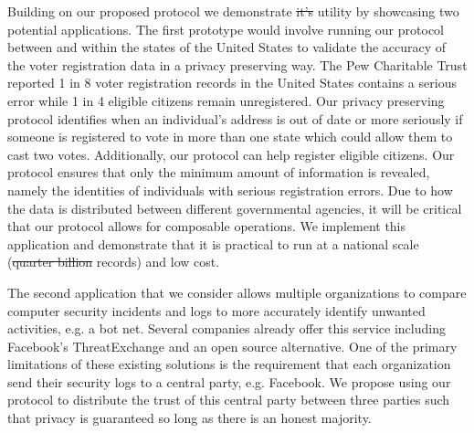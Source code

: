 \documentclass[11pt,letterpaper]{article}
\providecommand{\DIFaddtex}[1]{{\protect\color{blue}\uwave{#1}}} %
\providecommand{\DIFdeltex}[1]{{\protect\color{red}\sout{#1}}}                      %
\providecommand{\DIFaddbegin}{} %
\providecommand{\DIFaddend}{} %
\providecommand{\DIFdelbegin}{} %
\providecommand{\DIFdelend}{} %
\providecommand{\DIFadd}[1]{\texorpdfstring{\DIFaddtex{#1}}{#1}} %
\providecommand{\DIFdel}[1]{\texorpdfstring{\DIFdeltex{#1}}{}} %
\begin{document}
Building on our proposed protocol we demonstrate \DIFdelbegin \DIFdel{it's }\DIFdelend \DIFaddbegin \DIFadd{its }\DIFaddend utility by showcasing two potential applications. The first prototype would involve running our protocol between and within the states of the United States to validate the accuracy of the voter registration data in a privacy preserving way. The Pew Charitable Trust\cite{pew} reported 1 in 8 voter registration records in the United States contains a serious error while 1 in 4 eligible citizens remain unregistered. Our privacy preserving protocol identifies when an individual's address is out of date or more seriously if someone is registered to vote in more than one state which could allow them to cast two votes. 
\iffullversion
Additionally, our protocol can help register eligible citizens. Our protocol ensures that only the minimum amount of information is revealed, namely the identities of individuals with serious registration errors.
\fi 
Due to how the data is distributed between different governmental agencies, it will be critical that our protocol allows for composable operations. We implement this application and demonstrate that it is practical to run at a national scale (\DIFdelbegin \DIFdel{quarter billion }\DIFdelend \DIFaddbegin \DIFadd{250M }\DIFaddend records) and low cost.

The second application that we consider allows multiple organizations to compare computer security incidents and logs to more accurately identify unwanted activities, e.g. a bot net. Several companies already offer this service including Facebook's ThreatExchange\cite{threat} and an open source alternative\cite{alt_threat}. One of the primary limitations of these existing solutions is the requirement that each organization send their security logs to a central party, e.g. Facebook. We propose using our protocol to distribute the trust of this central party between three parties such that privacy is guaranteed so long as there is an honest majority.
\end{document}
